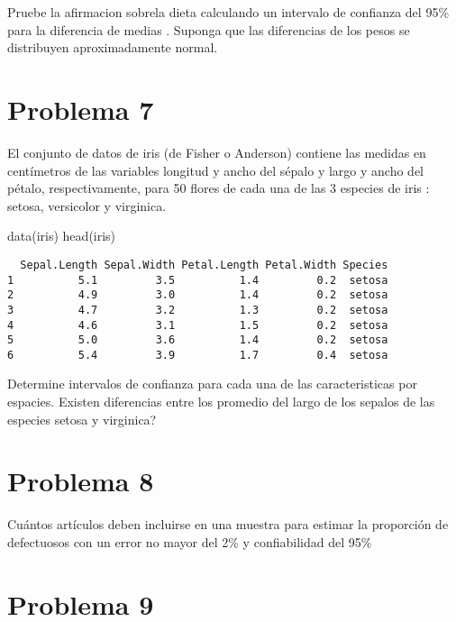\documentclass[
]{article}
\newenvironment{Shaded}{\begin{snugshade}}{\end{snugshade}}
\newcommand{\FunctionTok}[1]{\textcolor[rgb]{0.00,0.00,0.00}{#1}}
\newcommand{\NormalTok}[1]{#1}
\begin{document}
Pruebe la afirmacion sobrela dieta calculando un intervalo de confianza
del 95\% para la diferencia de medias . Suponga que las diferencias de
los pesos se distribuyen aproximadamente normal.

\hypertarget{problema-7}{%
\section{\texorpdfstring{\textbf{Problema
7}}{Problema 7}}\label{problema-7}}

El conjunto de datos de iris (de Fisher o Anderson) contiene las medidas
en centímetros de las variables longitud y ancho del sépalo y largo y
ancho del pétalo, respectivamente, para 50 flores de cada una de las 3
especies de iris : setosa, versicolor y virginica.

\begin{Shaded}
\begin{Highlighting}[]
\FunctionTok{data}\NormalTok{(iris)}
\FunctionTok{head}\NormalTok{(iris)}
\end{Highlighting}
\end{Shaded}

\begin{verbatim}
  Sepal.Length Sepal.Width Petal.Length Petal.Width Species
1          5.1         3.5          1.4         0.2  setosa
2          4.9         3.0          1.4         0.2  setosa
3          4.7         3.2          1.3         0.2  setosa
4          4.6         3.1          1.5         0.2  setosa
5          5.0         3.6          1.4         0.2  setosa
6          5.4         3.9          1.7         0.4  setosa
\end{verbatim}

Determine intervalos de confianza para cada una de las caracteristicas
por espacies. Existen diferencias entre los promedio del largo de los
sepalos de las especies setosa y virginica?

\hypertarget{problema-8}{%
\section{\texorpdfstring{\textbf{Problema
8}}{Problema 8}}\label{problema-8}}

Cuántos artículos deben incluirse en una muestra para estimar la
proporción de defectuosos con un error no mayor del 2\% y confiabilidad
del 95\%

\hypertarget{problema-9}{%
\section{\texorpdfstring{\textbf{Problema
9}}{Problema 9}}\label{problema-9}}
\end{document}
